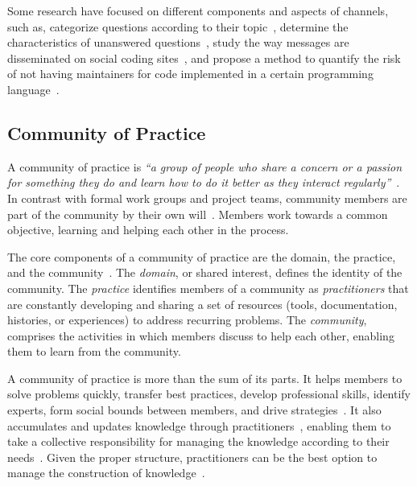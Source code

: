\documentclass{sig-alternate-05-2015}
\begin{document}
	Some research have focused on different components and aspects of channels, such as,
categorize questions according to their topic~\cite{Treude2011}, determine the characteristics of unanswered questions~\cite{Asaduzzaman2013}, study the way messages are disseminated on social coding sites~\cite{Jiang2013}, and propose a method to quantify the risk of not having maintainers for code implemented in a certain programming language~\cite{Vasilescu2013b}.

\subsection{Community of Practice}
	A community of practice is \textit{``a group of people who share a concern or a passion for something they do and learn how to do it better as they interact regularly''}~\cite{Wenger2000}.
	In contrast with formal work groups and project teams, community members are part of the community by their own will~\cite{Wenger2000}.
	Members work towards a common objective, learning and helping each other in the process.

	The core components of a community of practice are the domain, the practice, and the community~\cite{Wenger2011}.
	The \textit{domain}, or shared interest, defines the identity of the community.
	The \textit{practice} identifies members of a community as \textit{practitioners} that are constantly developing and sharing a set of resources (tools, documentation, histories, or experiences) to address recurring problems. 
	The \textit{community}, comprises the activities in which members discuss to help each other, enabling them to learn from the community.

	A community of practice is more than the sum of its parts.
	It helps members to solve problems quickly, transfer best practices, develop professional skills, identify experts, form social bounds between members, and drive strategies~\cite{Wenger2011, Storey2014}.
	It also accumulates and updates knowledge through practitioners~\cite{Wenger2010}, enabling them to take a collective responsibility for managing the knowledge according to their needs~\cite{Wenger2011}.
	Given the proper structure, practitioners can be the best option to manage the construction of knowledge~\cite{Wenger2011}.

\end{document}
